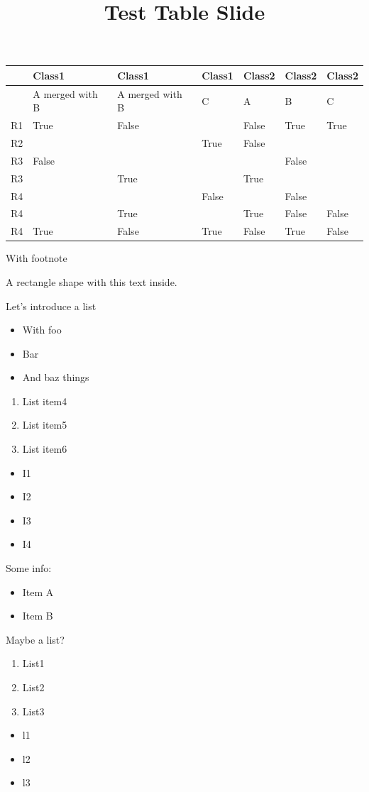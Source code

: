 \documentclass[11pt,a4paper]{article}
\title{Test Table Slide}
\begin{document}
\maketitle

\begin{table}[h]
\begin{tabular}{|l|l|l|l|l|l|l|}
\hline
 & Class1 & Class1 & Class1 & Class2 & Class2 & Class2 \\ \hline
 & A merged with B & A merged with B & C & A & B & C \\ \hline
R1 & True & False &  & False & True & True \\ \hline
R2 &  &  & True & False &  &  \\ \hline
R3 & False &  &  &  & False &  \\ \hline
R3 &  & True &  & True &  &  \\ \hline
R4 &  &  & False &  & False &  \\ \hline
R4 &  & True &  & True & False & False \\ \hline
R4 & True & False & True & False & True & False \\ \hline
\end{tabular}
\end{table}

With footnote

A rectangle shape with this text inside.

Let’s introduce a list

\begin{itemize}
\item With foo
\item Bar
\item And baz things
\end{itemize}

\begin{enumerate}
\item List item4
\item List item5
\item List item6
\end{enumerate}

\begin{itemize}
\item I1
\item I2
\item I3
\item I4
\end{itemize}

Some info:

\begin{itemize}
\item Item A
\item Item B
\end{itemize}

Maybe a list?

\begin{enumerate}
\item List1
\item List2
\item List3
\end{enumerate}

\begin{itemize}
\item l1 
\item l2
\item l3
\end{itemize}
\end{document}
